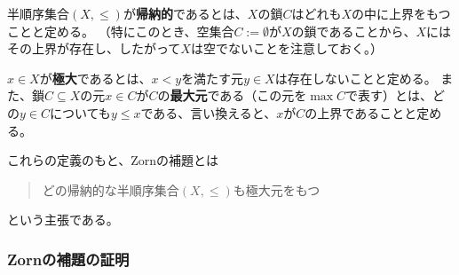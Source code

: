 ﻿\documentclass{ltjsarticle}
\theoremstyle{definition}
\begin{document}
半順序集合$(X,\leq)$が\textbf{帰納的}であるとは、$X$の鎖$C$はどれも$X$の中に上界をもつことと定める。
（特にこのとき、空集合$C := \emptyset$が$X$の鎖であることから、$X$にはその上界が存在し、したがって$X$は空でないことを注意しておく。）

$x \in X$が\textbf{極大}であるとは、$x < y$を満たす元$y \in X$は存在しないことと定める。
また、鎖$C \subseteq X$の元$x \in C$が$C$の\textbf{最大元}である（この元を$\max C$で表す）とは、どの$y \in C$についても$y \leq x$である、言い換えると、$x$が$C$の上界であることと定める。

これらの定義のもと、Zornの補題とは
\begin{quote}
    どの帰納的な半順序集合$(X,\leq)$も極大元をもつ
\end{quote}
という主張である。

\subsubsection*{Zornの補題の証明}
\end{document}
